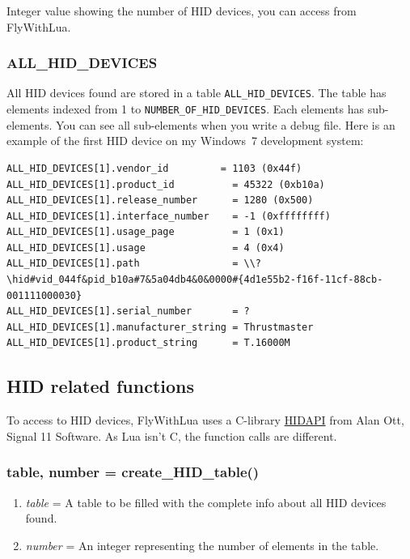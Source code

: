 \documentclass[11pt,parskip=half,a4paper]{scrartcl}
\begin{document}
Integer value showing the number of HID devices, you can access from FlyWithLua.

\subsubsection{ALL\_HID\_DEVICES}

All HID devices found are stored in a table \verb|ALL_HID_DEVICES|. The table has elements indexed from 1 to \verb|NUMBER_OF_HID_DEVICES|. Each elements has sub-elements. You can see all sub-elements when you write a debug file. Here is an example of the first HID device on my Windows~7 development system:

\begin{lstlisting}[firstnumber=630]
ALL_HID_DEVICES[1].vendor_id         = 1103 (0x44f)
ALL_HID_DEVICES[1].product_id          = 45322 (0xb10a)
ALL_HID_DEVICES[1].release_number      = 1280 (0x500)
ALL_HID_DEVICES[1].interface_number    = -1 (0xffffffff)
ALL_HID_DEVICES[1].usage_page          = 1 (0x1)
ALL_HID_DEVICES[1].usage               = 4 (0x4)
ALL_HID_DEVICES[1].path                = \\?\hid#vid_044f&pid_b10a#7&5a04db4&0&0000#{4d1e55b2-f16f-11cf-88cb-001111000030}
ALL_HID_DEVICES[1].serial_number       = ?
ALL_HID_DEVICES[1].manufacturer_string = Thrustmaster
ALL_HID_DEVICES[1].product_string      = T.16000M
\end{lstlisting}

\subsection{HID related functions}

To access to HID devices, FlyWithLua uses a C-library \href{http://www.signal11.us/oss/hidapi/}{HIDAPI} from Alan Ott, Signal 11 Software. As Lua isn't C, the function calls are different. 

\subsubsection{table, number = create\_HID\_table()}

\begin{enumerate}
\item \emph{table} = A table to be filled with the complete info about all HID devices found.
\item \emph{number} = An integer representing the number of elements in the table.
\end{enumerate}
\end{document}
